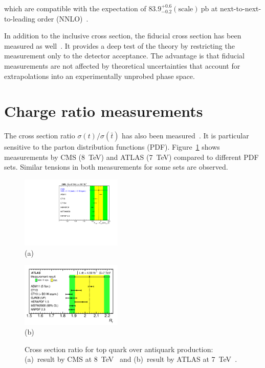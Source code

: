 \documentclass{PoS}
\begin{document}
which are compatible with the expectation of $83.9_{-0.2}^{+0.6}\mathrm{(scale)}~\mathrm{pb}$ at next-to-next-to-leading order (NNLO)~\cite{Brucherseifer-xsec8}.

In addition to the inclusive cross section, the fiducial cross section has been measured as well~\cite{atlas-xsec8,CMS-PAS-TOP-15-007}. It provides a deep test of the theory by restricting the measurement only to the detector acceptance. The advantage is that fiducial measurements are not affected by theoretical uncertainties that account for extrapolations into an experimentally unprobed phase space.





\section{Charge ratio measurements}
The cross section ratio $\sigma(t)/\sigma(\bar{t})$ has also been measured~\cite{cms-xsec8,atlas-charge7}. It is particular sensitive to the parton distribution functions (PDF). Figure~\ref{fig:charge-ratio} shows measurements by CMS (8~TeV) and ATLAS (7~TeV) compared to different PDF sets. Similar tensions in both measurements for some sets are observed. 

\begin{figure}[htbp]
\begin{center}
\parbox[t]{0.45\textwidth}{\centering\includegraphics[width=0.43\textwidth]{cms_xsec8/charge.pdf}\\(a)}
\parbox[t]{0.45\textwidth}{\centering\includegraphics[width=0.43\textwidth]{atlas_charge7/charge.pdf}\\(b)}
\end{center}
\caption{\label{fig:charge-ratio}Cross section ratio for top quark over antiquark production: (a)~result by CMS at 8~TeV~\cite{cms-xsec8} and (b)~result by ATLAS at 7~TeV~\cite{atlas-charge7}.}

\end{figure}
\end{document}
